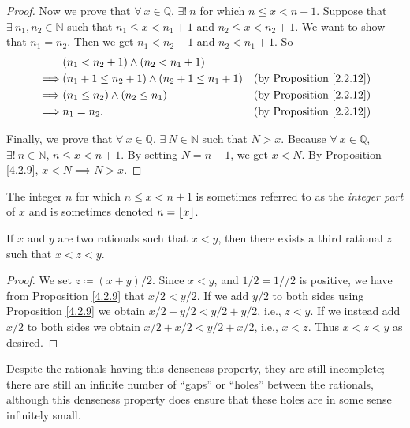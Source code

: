\begin{proof}
Now we prove that \(\forall\ x \in \mathds{Q}\), \(\exists!\ n\) for which \(n \leq x < n + 1\).
Suppose that \(\exists\ n_1, n_2 \in \mathds{N}\) such that \(n_1 \leq x < n_1 + 1\) and \(n_2 \leq x < n_2 + 1\).
We want to show that \(n_1 = n_2\).
Then we get \(n_1 < n_2 + 1\) and \(n_2 < n_1 + 1\).
So
\begin{align*}
& (n_1 < n_2 + 1) \land (n_2 < n_1 + 1) \\
\implies & (n_1 + 1 \leq n_2 + 1) \land (n_2 + 1 \leq n_1 + 1) & \text{(by Proposition \ref{2.2.12})} \\
\implies & (n_1 \leq n_2) \land (n_2 \leq n_1) & \text{(by Proposition \ref{2.2.12})} \\
\implies & n_1 = n_2. & \text{(by Proposition \ref{2.2.12})}
\end{align*}

Finally, we prove that \(\forall\ x \in \mathds{Q}\), \(\exists\ N \in \mathds{N}\) such that \(N > x\).
Because \(\forall\ x \in \mathds{Q}\), \(\exists!\ n \in \mathds{N}\), \(n \leq x < n + 1\).
By setting \(N = n + 1\), we get \(x < N\).
By Proposition \ref{4.2.9}, \(x < N \implies N > x\).
\end{proof}

\begin{remark}\label{4.4.2}
The integer \(n\) for which \(n \leq x < n + 1\) is sometimes referred to as the \emph{integer part} of \(x\) and is sometimes denoted \(n = \floor*{x}\).
\end{remark}

\begin{proposition}\label{4.4.3}
If \(x\) and \(y\) are two rationals such that \(x < y\), then there exists a third rational \(z\) such that \(x < z < y\).
\end{proposition}

\begin{proof}
We set \(z \coloneqq (x + y) / 2\).
Since \(x < y\), and \(1 / 2 = 1 // 2\) is positive, we have from Proposition \ref{4.2.9} that \(x / 2 < y / 2\).
If we add \(y / 2\) to both sides using Proposition \ref{4.2.9} we obtain \(x / 2 + y / 2 < y / 2 + y / 2\), i.e., \(z < y\).
If we instead add \(x / 2\) to both sides we obtain \(x / 2 + x / 2 < y / 2 + x / 2\), i.e., \(x < z\).
Thus \(x < z < y\) as desired.
\end{proof}

\begin{note}
Despite the rationals having this denseness property, they are still incomplete;
there are still an infinite number of ``gaps'' or ``holes'' between the rationals, although this denseness property does ensure that these holes are in some sense infinitely small.
\end{note}

